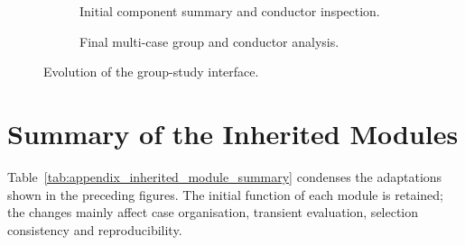 \begin{figure}[!htbp]
    \centering

    \begin{subfigure}[t]{0.96\textwidth}
        \centering
        \caption{Initial component summary and conductor inspection.}
        \label{fig:appendix_original_group_study}
    \end{subfigure}

    \vspace{0.8em}

    \begin{subfigure}[t]{0.96\textwidth}
        \centering
        \caption{Final multi-case group and conductor analysis.}
        \label{fig:appendix_final_group_study}
    \end{subfigure}

    \caption{Evolution of the group-study interface.}
    \label{fig:appendix_group_study_evolution}
\end{figure}

\FloatBarrier

\section{Summary of the Inherited Modules}
\label{appsec:inherited_modules_summary}

Table~\ref{tab:appendix_inherited_module_summary} condenses the adaptations
shown in the preceding figures. The initial function of each module is
retained; the changes mainly affect case organisation, transient evaluation,
selection consistency and reproducibility.



\FloatBarrier
